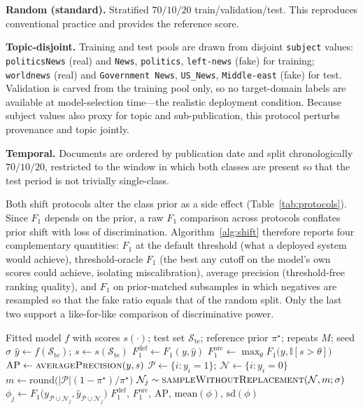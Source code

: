 \documentclass[conference]{IEEEtran}
\newcommand{\Fone}{$F_1$}
\begin{document}
\textbf{Random (standard).} Stratified $70/10/20$ train/validation/test. This
reproduces conventional practice and provides the reference score.

\textbf{Topic-disjoint.} Training and test pools are drawn from disjoint
\texttt{subject} values: \texttt{politicsNews} (real) and
\texttt{News}, \texttt{politics}, \texttt{left-news} (fake) for training;
\texttt{worldnews} (real) and \texttt{Government News}, \texttt{US\_News},
\texttt{Middle-east} (fake) for test. Validation is carved from the training
pool only, so no target-domain labels are available at model-selection
time---the realistic deployment condition. Because subject values also proxy
for topic and sub-publication, this protocol perturbs provenance and topic
jointly.

\textbf{Temporal.} Documents are ordered by publication date and split
chronologically $70/10/20$, restricted to the window in which both classes are
present so that the test period is not trivially single-class.

Both shift protocols alter the class prior as a side effect
(Table~\ref{tab:protocols}). Since \Fone{} depends on the prior, a raw \Fone{}
comparison across protocols conflates prior shift with loss of discrimination.
Algorithm~\ref{alg:shift} therefore reports four complementary quantities:
\Fone{} at the default threshold (what a deployed system would achieve),
threshold-oracle \Fone{} (the best any cutoff on the model's own scores could
achieve, isolating miscalibration), average precision (threshold-free ranking
quality), and \Fone{} on prior-matched subsamples in which negatives are
resampled so that the fake ratio equals that of the random split. Only the last
two support a like-for-like comparison of discriminative power.

\begin{algorithm}[t]
\caption{Prior-controlled shift evaluation}
\label{alg:shift}
\begin{algorithmic}[1]
\Require Fitted model $f$ with scores $s(\cdot)$; test set
  $\mathcal{S}_{\text{te}}$; reference prior $\pi^{\star}$; repeats $M$; seed $\sigma$
\State $\hat{y}\gets f(\mathcal{S}_{\text{te}})$;\;
       $s\gets s(\mathcal{S}_{\text{te}})$
\State $F_1^{\text{def}} \gets F_1(y,\hat{y})$
\State $F_1^{\text{orc}} \gets \max_{\theta} F_1\big(y,\mathbb{I}[s>\theta]\big)$
\State $\mathrm{AP} \gets \textsc{averagePrecision}(y,s)$
\State $\mathcal{P}\gets\{i: y_i{=}1\}$;\;
       $\mathcal{N}\gets\{i: y_i{=}0\}$
\State $m \gets \mathrm{round}\big(|\mathcal{P}|(1-\pi^{\star})/\pi^{\star}\big)$
  \State $\mathcal{N}_j \sim \textsc{sampleWithoutReplacement}(\mathcal{N},m;\sigma)$
  \State $\phi_j \gets F_1\big(y_{\mathcal{P}\cup\mathcal{N}_j},
         \hat{y}_{\mathcal{P}\cup\mathcal{N}_j}\big)$
\EndFor
\State \Return $F_1^{\text{def}},\,F_1^{\text{orc}},\,\mathrm{AP},\,
  \mathrm{mean}(\phi),\,\mathrm{sd}(\phi)$
\end{algorithmic}
\end{algorithm}
\end{document}
